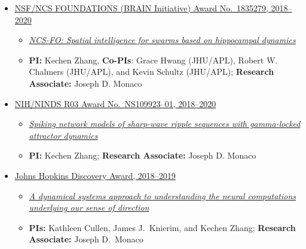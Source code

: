 \documentclass[10pt]{article}
\begin{document}
\begin{itemize}
\item \href{https://www.nsf.gov/awardsearch/showAward?AWD_ID=1835279&HistoricalAwards=false}{NSF\slash NCS FOUNDATIONS (BRAIN Initiative) Award No.~1835279, 2018--2020}

\begin{itemize}

\item \href{https://www.nsf.gov/awardsearch/showAward?AWD_ID=1835279&HistoricalAwards=false}{\emph{NCS-FO: Spatial intelligence for swarms based on hippocampal dynamics}}

\item \textbf{PI:} Kechen Zhang, \textbf{Co-PIs}: Grace Hwang (JHU\slash APL), Robert W. Chalmers (JHU\slash APL), and Kevin Schultz (JHU\slash APL); \textbf{Research Associate:} Joseph D. Monaco
\end{itemize}

\item \href{https://projectreporter.nih.gov/project_info_description.cfm?aid=9652210&icde=42555668&ddparam=&ddvalue=&ddsub=&cr=2&csb=default&cs=ASC&pball=}{NIH/NINDS R03 Award No.~NS109923--01, 2018--2020}

\begin{itemize}
\item \href{https://projectreporter.nih.gov/project_info_description.cfm?aid=9652210&icde=42555668&ddparam=&ddvalue=&ddsub=&cr=2&csb=default&cs=ASC&pball=}{\emph{Spiking network models of sharp-wave ripple sequences with gamma-locked attractor dynamics}}

\item \textbf{PI:} Kechen Zhang; \textbf{Research Associate:} Joseph D. Monaco

\end{itemize}

\item \href{https://research.jhu.edu/major-initiatives/discovery-awards/2018-awardees/}{Johns Hopkins Discovery Award, 2018--2019}

\begin{itemize}
\item \href{https://research.jhu.edu/major-initiatives/discovery-awards/2018-awardees/}{\emph{A dynamical systems approach to understanding the neural computations underlying our sense of direction}}

\item \textbf{PIs:} Kathleen Cullen, James J.~Knierim, and Kechen Zhang; \textbf{Research Associate:} Joseph D.~Monaco


\end{itemize}
\end{itemize}
\end{document}
